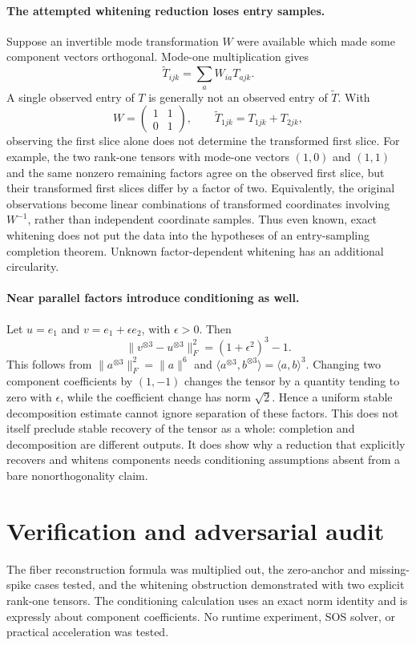 \documentclass[11pt]{article}
\begin{document}
\paragraph{The attempted whitening reduction loses entry samples.}
Suppose an invertible mode transformation $W$ were available which made some component vectors orthogonal. Mode-one multiplication gives
\[
 \widetilde T_{ijk}=\sum_a W_{ia}T_{ajk}.
\]
A single observed entry of $T$ is generally not an observed entry of $\widetilde T$. With
\[
 W=\begin{pmatrix}1&1\\0&1\end{pmatrix},
 \qquad \widetilde T_{1jk}=T_{1jk}+T_{2jk},
\]
observing the first slice alone does not determine the transformed first slice. For example, the two rank-one tensors with mode-one vectors $(1,0)$ and $(1,1)$ and the same nonzero remaining factors agree on the observed first slice, but their transformed first slices differ by a factor of two. Equivalently, the original observations become linear combinations of transformed coordinates involving $W^{-1}$, rather than independent coordinate samples. Thus even known, exact whitening does not put the data into the hypotheses of an entry-sampling completion theorem. Unknown factor-dependent whitening has an additional circularity.

\paragraph{Near parallel factors introduce conditioning as well.}
Let $u=e_1$ and $v=e_1+\epsilon e_2$, with $\epsilon>0$. Then
\[
 \|v^{\otimes3}-u^{\otimes3}\|_F^2=(1+\epsilon^2)^3-1.
\]
This follows from $\|a^{\otimes3}\|_F^2=\|a\|^6$ and $\langle a^{\otimes3},b^{\otimes3}\rangle=\langle a,b\rangle^3$. Changing two component coefficients by $(1,-1)$ changes the tensor by a quantity tending to zero with $\epsilon$, while the coefficient change has norm $\sqrt2$. Hence a uniform stable decomposition estimate cannot ignore separation of these factors. This does not itself preclude stable recovery of the tensor as a whole: completion and decomposition are different outputs. It does show why a reduction that explicitly recovers and whitens components needs conditioning assumptions absent from a bare nonorthogonality claim.
\section{Verification and adversarial audit}
The fiber reconstruction formula was multiplied out, the zero-anchor and missing-spike cases tested, and the whitening obstruction demonstrated with two explicit rank-one tensors. The conditioning calculation uses an exact norm identity and is expressly about component coefficients. No runtime experiment, SOS solver, or practical acceleration was tested.
\end{document}

